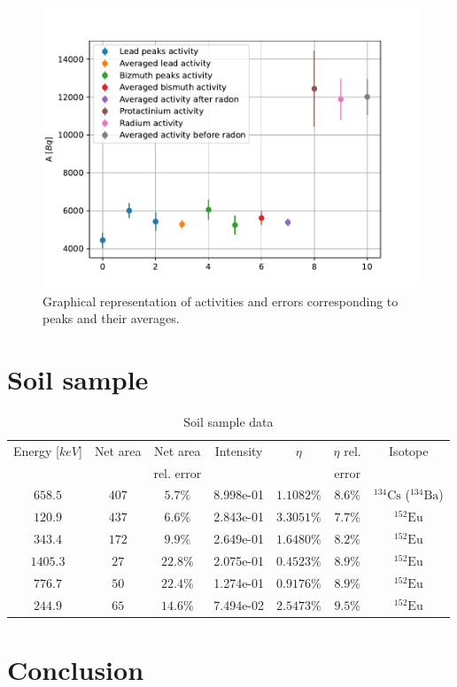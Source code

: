 \documentclass[pdftex,12pt,a4paper]{article}
\begin{document}
		\begin{figure}
			\centering
			\includegraphics[scale=1]{./figs/graniteactivities.pdf}
			\caption{Graphical representation of activities and errors corresponding to peaks and their averages.}
			\label{graniteaveragesfig}
		\end{figure}
	\section{Soil sample}
		\begin{table}[H]
		\centering
		\begin{tabular}{|c|c|c|c|c|c|c|}
			\hline
			Energy [$keV$] & Net area & Net area   & Intensity & $\eta$ & $\eta$ rel. & Isotope \\
			               &          & rel. error &           &        & error       &         \\
			\hline
            $658.5$ & $407$ & $5.7\%$ & 8.998e-01 & $1.1082\%$ & $8.6\%$ & $^{134}\text{Cs}$ ($^{134}\text{Ba}$) \\
            $120.9$ & $437$ & $6.6\%$ & 2.843e-01 & $3.3051\%$ & $7.7\%$ & $^{152}\text{Eu}$ \\
            $343.4$ & $172$ & $9.9\%$ & 2.649e-01 & $1.6480\%$ & $8.2\%$ & $^{152}\text{Eu}$ \\
            $1405.3$ & $27$ & $22.8\%$ & 2.075e-01 & $0.4523\%$ & $8.9\%$ & $^{152}\text{Eu}$ \\
            $776.7$ & $50$ & $22.4\%$ & 1.274e-01 & $0.9176\%$ & $8.9\%$ & $^{152}\text{Eu}$ \\
            $244.9$ & $65$ & $14.6\%$ & 7.494e-02 & $2.5473\%$ & $9.5\%$ & $^{152}\text{Eu}$ \\
			\hline
		\end{tabular}
		\caption{Soil sample data}
		\end{table}
	\section{Conclusion}
	
    
\end{document}
